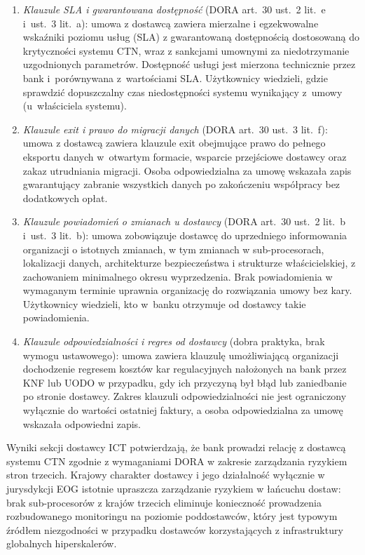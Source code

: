 \begin{enumerate}[label=(\roman*)]
\item \textit{Klauzule SLA i gwarantowana dostępność} (DORA art.~30 ust.~2 lit.~e i~ust.~3 lit.~a): umowa z dostawcą zawiera mierzalne i egzekwowalne wskaźniki poziomu usług (SLA) z gwarantowaną dostępnością dostosowaną do krytyczności systemu CTN, wraz z sankcjami umownymi za niedotrzymanie uzgodnionych parametrów. Dostępność usługi jest mierzona technicznie przez bank i~porównywana z~wartościami SLA. Użytkownicy wiedzieli, gdzie sprawdzić dopuszczalny czas niedostępności systemu wynikający z~umowy (u~właściciela systemu).

\item \textit{Klauzule exit i prawo do migracji danych} (DORA art.~30 ust.~3 lit.~f): umowa z dostawcą zawiera klauzule exit obejmujące prawo do pełnego eksportu danych w~otwartym formacie, wsparcie przejściowe dostawcy oraz zakaz utrudniania migracji. Osoba odpowiedzialna za umowę wskazała zapis gwarantujący zabranie wszystkich danych po zakończeniu współpracy bez dodatkowych opłat.

\item \textit{Klauzule powiadomień o zmianach u dostawcy} (DORA art.~30 ust.~2 lit.~b i~ust.~3 lit.~b): umowa zobowiązuje dostawcę do uprzedniego informowania organizacji o istotnych zmianach, w tym zmianach w sub-procesorach, lokalizacji danych, architekturze bezpieczeństwa i strukturze właścicielskiej, z zachowaniem minimalnego okresu wyprzedzenia. Brak powiadomienia w wymaganym terminie uprawnia organizację do rozwiązania umowy bez kary. Użytkownicy wiedzieli, kto w~banku otrzymuje od dostawcy takie powiadomienia.

\item \textit{Klauzule odpowiedzialności i regres od dostawcy} (dobra praktyka, brak wymogu ustawowego): umowa zawiera klauzulę umożliwiającą organizacji dochodzenie regresem kosztów kar regulacyjnych nałożonych na bank przez KNF lub UODO w przypadku, gdy ich przyczyną był błąd lub zaniedbanie po stronie dostawcy. Zakres klauzuli odpowiedzialności nie jest ograniczony wyłącznie do wartości ostatniej faktury, a osoba odpowiedzialna za umowę wskazała odpowiedni zapis.
\end{enumerate}

Wyniki sekcji dostawcy ICT potwierdzają, że bank prowadzi relację z dostawcą systemu CTN zgodnie z wymaganiami DORA w zakresie zarządzania ryzykiem stron trzecich. Krajowy charakter dostawcy i jego działalność wyłącznie w jurysdykcji EOG istotnie upraszcza zarządzanie ryzykiem w łańcuchu dostaw: brak sub-procesorów z krajów trzecich eliminuje konieczność prowadzenia rozbudowanego monitoringu na poziomie poddostawców, który jest typowym źródłem niezgodności w przypadku dostawców korzystających z infrastruktury globalnych hiperskalerów.

